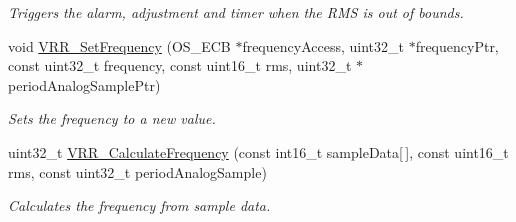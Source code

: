 \begin{DoxyCompactItemize}
\begin{DoxyCompactList}\small\item\em Triggers the alarm, adjustment and timer when the R\+M\+S is out of bounds. \end{DoxyCompactList}\item 
void \hyperlink{group___v_r_r__module_ga86c619fba042609fa87246ef742e466e}{V\+R\+R\+\_\+\+Set\+Frequency} (O\+S\+\_\+\+E\+C\+B $\ast$frequency\+Access, uint32\+\_\+t $\ast$frequency\+Ptr, const uint32\+\_\+t frequency, const uint16\+\_\+t rms, uint32\+\_\+t $\ast$period\+Analog\+Sample\+Ptr)
\begin{DoxyCompactList}\small\item\em Sets the frequency to a new value. \end{DoxyCompactList}\item 
uint32\+\_\+t \hyperlink{group___v_r_r__module_ga62b2158646147efadf49c870f3245c0d}{V\+R\+R\+\_\+\+Calculate\+Frequency} (const int16\+\_\+t sample\+Data\mbox{[}$\,$\mbox{]}, const uint16\+\_\+t rms, const uint32\+\_\+t period\+Analog\+Sample)
\begin{DoxyCompactList}\small\item\em Calculates the frequency from sample data. \end{DoxyCompactList}\end{DoxyCompactItemize}
